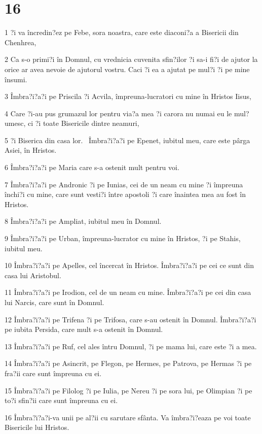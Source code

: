 \chapter{16}

\par 1 ?i va încredin?ez pe Febe, sora noastra, care este diaconi?a a Bisericii din Chenhrea,
\par 2 Ca s-o primi?i în Domnul, cu vrednicia cuvenita sfin?ilor ?i sa-i fi?i de ajutor la orice ar avea nevoie de ajutorul vostru. Caci ?i ea a ajutat pe mul?i ?i pe mine însumi.
\par 3 Îmbra?i?a?i pe Priscila ?i Acvila, împreuna-lucratori cu mine în Hristos Iisus,
\par 4 Care ?i-au pus grumazul lor pentru via?a mea ?i carora nu numai eu le mul?umesc, ci ?i toate Bisericile dintre neamuri,
\par 5 ?i Biserica din casa lor.  Îmbra?i?a?i pe Epenet, iubitul meu, care este pârga Asiei, în Hristos.
\par 6 Îmbra?i?a?i pe Maria care s-a ostenit mult pentru voi.
\par 7 Îmbra?i?a?i pe Andronic ?i pe Iunias, cei de un neam cu mine ?i împreuna închi?i cu mine, care sunt vesti?i între apostoli ?i care înaintea mea au fost în Hristos.
\par 8 Îmbra?i?a?i pe Ampliat, iubitul meu în Domnul.
\par 9 Îmbra?i?a?i pe Urban, împreuna-lucrator cu mine în Hristos, ?i pe Stahis, iubitul meu.
\par 10 Îmbra?i?a?i pe Apelles, cel încercat în Hristos. Îmbra?i?a?i pe cei ce sunt din casa lui Aristobul.
\par 11 Îmbra?i?a?i pe Irodion, cel de un neam cu mine. Îmbra?i?a?i pe cei din casa lui Narcis, care sunt în Domnul.
\par 12 Îmbra?i?a?i pe Trifena ?i pe Trifosa, care s-au ostenit în Domnul. Îmbra?i?a?i pe iubita Persida, care mult s-a ostenit în Domnul.
\par 13 Îmbra?i?a?i pe Ruf, cel ales întru Domnul, ?i pe mama lui, care este ?i a mea.
\par 14 Îmbra?i?a?i pe Asincrit, pe Flegon, pe Hermes, pe Patrova, pe Hermas ?i pe fra?ii care sunt împreuna cu ei.
\par 15 Îmbra?i?a?i pe Filolog ?i pe Iulia, pe Nereu ?i pe sora lui, pe Olimpian ?i pe to?i sfin?ii care sunt împreuna cu ei.
\par 16 Îmbra?i?a?i-va unii pe al?ii cu sarutare sfânta. Va îmbra?i?eaza pe voi toate Bisericile lui Hristos.
